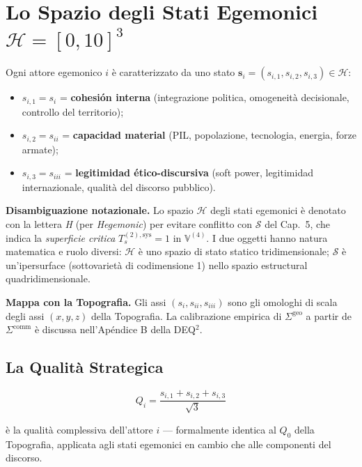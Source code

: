 \section{\texorpdfstring{Lo Spazio degli Stati Egemonici
\(\mathcal{H} = [0, 10]^3\)}{Lo Spazio degli Stati Egemonici \textbackslash mathcal\{H\} = {[}0, 10{]}\^{}3}}\label{lo-spazio-degli-stati-egemonici-mathcalh-0-103}

Ogni attore egemonico \(i\) è caratterizzato da uno stato
\(\mathbf{s}_i = (s_{i,1}, s_{i,2}, s_{i,3}) \in \mathcal{H}\):

\begin{itemize}
\tightlist
\item
  \(s_{i,1} = s_i\) = \textbf{cohesión interna} (integrazione politica,
  omogeneità decisionale, controllo del territorio);
\item
  \(s_{i,2} = s_{ii}\) = \textbf{capacidad material} (PIL, popolazione,
  tecnologia, energia, forze armate);
\item
  \(s_{i,3} = s_{iii}\) = \textbf{legitimidad ético-discursiva} (soft
  power, legitimidad internazionale, qualità del discorso pubblico).
\end{itemize}

\Hypoth{} \textbf{Disambiguazione notazionale.} Lo spazio
\(\mathcal{H}\) degli stati egemonici è denotato con la lettera \emph{H}
(per \emph{Hegemonic}) per evitare conflitto con \(\mathcal{S}\) del
Cap.~5, che indica la \emph{superficie critica}
\(T_s^{(2),\text{sys}} = 1\) in \(\mathbb{V}^{(4)}\). I due oggetti
hanno natura matematica e ruolo diversi: \(\mathcal{H}\) è uno spazio di
stato statico tridimensionale; \(\mathcal{S}\) è un'ipersurface
(sottovarietà di codimensione 1) nello spazio estructural
quadridimensionale.

\Hypoth{} \textbf{Mappa con la Topografia.} Gli assi
\((s_i, s_{ii}, s_{iii})\) sono gli omologhi di scala degli assi
\((x, y, z)\) della Topografia. La calibrazione empirica di
\(\Sigma^{\text{geo}}\) a partir de \(\Sigma^{\text{comm}}\) è discussa
nell'Apéndice B della DEQ$^2$.

\subsection{La Qualità Strategica}\label{la-qualituxe0-strategica}

\[
Q_i = \frac{s_{i,1} + s_{i,2} + s_{i,3}}{\sqrt{3}}
\]

è la qualità complessiva dell'attore \(i\) --- formalmente identica al
\(Q_0\) della Topografia, applicata agli stati egemonici en cambio che alle
componenti del discorso.



